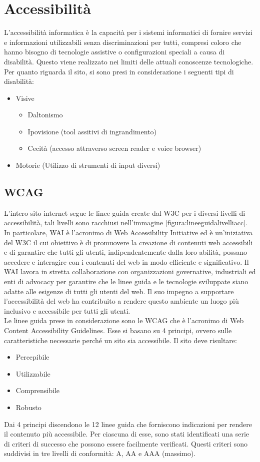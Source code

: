 \documentclass[a4paper,final,12pt]{report}
\begin{document}
\section{Accessibilità}
L'accessibilità informatica è la capacità per i sistemi informatici di fornire servizi e informazioni utilizzabili senza discriminazioni per tutti, compresi coloro che hanno bisogno di tecnologie assistive o configurazioni speciali a causa di disabilità. Questo viene realizzato nei limiti delle attuali conoscenze tecnologiche. Per quanto riguarda il sito, si sono presi in considerazione i seguenti tipi di disabilità:
\begin{itemize}
\item Visive
\begin{itemize}
\item Daltonismo
\item Ipovisione (tool assitivi di ingrandimento)
\item Cecità (accesso attraverso screen reader e voice browser)
\end{itemize}
\item Motorie (Utilizzo di strumenti di input diversi)
\end{itemize}

\subsection{WCAG}
L'intero sito internet segue le linee guida create dal W3C \cite{W3C} per i diversi livelli di accessibilità, tali livelli sono racchiusi nell'immagine \ref{figura:lineeguidalivelliacc}.
In particolare, WAI è l'acronimo di Web Accessibility Initiative ed è un'iniziativa del W3C il cui obiettivo è di promuovere la creazione di contenuti web accessibili e di garantire che tutti gli utenti, indipendentemente dalla loro abilità, possano accedere e interagire con i contenuti del web in modo efficiente e significativo. Il WAI lavora in stretta collaborazione con organizzazioni governative, industriali ed enti di advocacy per garantire che le linee guida e le tecnologie sviluppate siano adatte alle esigenze di tutti gli utenti del web. Il suo impegno a supportare l'accessibilità del web ha contribuito a rendere questo ambiente un luogo più inclusivo e accessibile per tutti gli utenti.\\
Le linee guida prese in considerazione sono le WCAG \cite{WCAG} che è l'acronimo di Web Content Accessibility Guidelines.
Esse si basano su 4 principi, ovvero sulle caratteristiche necessarie perché un sito sia accessibile. Il sito deve risultare:
\begin{itemize}
\item Percepibile
\item Utilizzabile
\item Comprensibile
\item Robusto
\end{itemize}
Dai 4 principi discendono le 12 linee guida che
forniscono indicazioni per rendere il contenuto più accessibile. Per ciascuna di esse, sono stati identificati una serie di criteri di successo che possono essere facilmente verificati. Questi criteri sono suddivisi in tre livelli di conformità: A, AA e AAA (massimo). 
\end{document}
